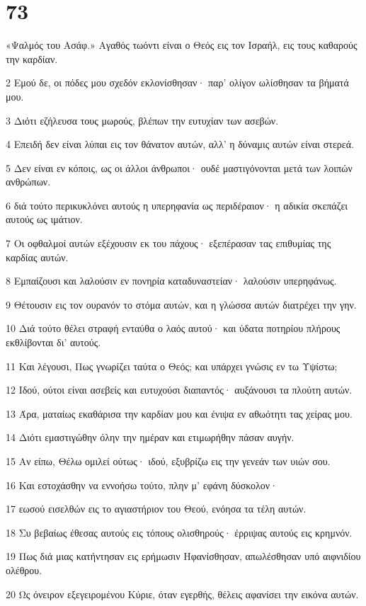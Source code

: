 \chapter{73}

\par «Ψαλμός του Ασάφ.» Αγαθός τωόντι είναι ο Θεός εις τον Ισραήλ, εις τους καθαρούς την καρδίαν.
\par 2 Εμού δε, οι πόδες μου σχεδόν εκλονίσθησαν· παρ' ολίγον ωλίσθησαν τα βήματά μου.
\par 3 Διότι εζήλευσα τους μωρούς, βλέπων την ευτυχίαν των ασεβών.
\par 4 Επειδή δεν είναι λύπαι εις τον θάνατον αυτών, αλλ' η δύναμις αυτών είναι στερεά.
\par 5 Δεν είναι εν κόποις, ως οι άλλοι άνθρωποι· ουδέ μαστιγόνονται μετά των λοιπών ανθρώπων.
\par 6 διά τούτο περικυκλόνει αυτούς η υπερηφανία ως περιδέραιον· η αδικία σκεπάζει αυτούς ως ιμάτιον.
\par 7 Οι οφθαλμοί αυτών εξέχουσιν εκ του πάχους· εξεπέρασαν τας επιθυμίας της καρδίας αυτών.
\par 8 Εμπαίζουσι και λαλούσιν εν πονηρία καταδυναστείαν· λαλούσιν υπερηφάνως.
\par 9 Θέτουσιν εις τον ουρανόν το στόμα αυτών, και η γλώσσα αυτών διατρέχει την γην.
\par 10 Διά τούτο θέλει στραφή ενταύθα ο λαός αυτού· και ύδατα ποτηρίου πλήρους εκθλίβονται δι' αυτούς.
\par 11 Και λέγουσι, Πως γνωρίζει ταύτα ο Θεός; και υπάρχει γνώσις εν τω Υψίστω;
\par 12 Ιδού, ούτοι είναι ασεβείς και ευτυχούσι διαπαντός· αυξάνουσι τα πλούτη αυτών.
\par 13 Άρα, ματαίως εκαθάρισα την καρδίαν μου και ένιψα εν αθωότητι τας χείρας μου.
\par 14 Διότι εμαστιγώθην όλην την ημέραν και ετιμωρήθην πάσαν αυγήν.
\par 15 Αν είπω, Θέλω ομιλεί ούτως· ιδού, εξυβρίζω εις την γενεάν των υιών σου.
\par 16 Και εστοχάσθην να εννοήσω τούτο, πλην μ' εφάνη δύσκολον·
\par 17 εωσού εισελθών εις το αγιαστήριον του Θεού, ενόησα τα τέλη αυτών.
\par 18 Συ βεβαίως έθεσας αυτούς εις τόπους ολισθηρούς· έρριψας αυτούς εις κρημνόν.
\par 19 Πως διά μιας κατήντησαν εις ερήμωσιν Ηφανίσθησαν, απωλέσθησαν υπό αιφνιδίου ολέθρου.
\par 20 Ως όνειρον εξεγειρομένου Κύριε, όταν εγερθής, θέλεις αφανίσει την εικόνα αυτών.
